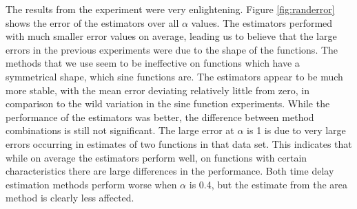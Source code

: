 \documentclass[a4paper,11pt]{article}
\begin{document}
The results from the experiment were very enlightening. Figure
\ref{fig:randerror} shows the error of the estimators over all $\alpha$
values. The estimators performed with much smaller error values on average,
leading us to believe that the large errors in the previous experiments were due
to the shape of the functions. The methods that we use seem to be ineffective on
functions which have a symmetrical shape, which sine functions are. The
estimators appear to be much more stable, with the mean error deviating
relatively little from zero, in comparison to the wild variation in the sine
function experiments. While the performance of the estimators was better, the
difference between method combinations is still not significant. The large error
at $\alpha$ is 1 is due to very large errors occurring in estimates of two
functions in that data set. This indicates that while on average the estimators
perform well, on functions with certain characteristics there are large
differences in the performance. Both time delay estimation methods perform worse
when $\alpha$ is 0.4, but the estimate from the area method is clearly less
affected.
\end{document}
